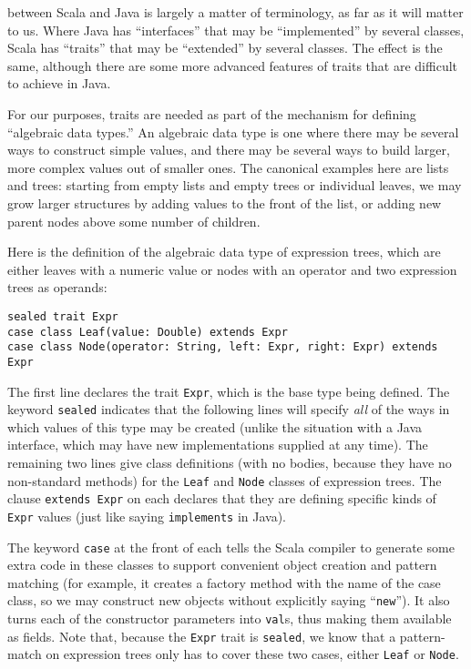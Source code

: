  between Scala and Java is largely a matter of terminology, as far as it will matter to us. Where Java has ``interfaces'' that may be ``implemented'' by several classes, Scala has ``traits'' that may be ``extended'' by several classes. The effect is the same, although there are some more advanced features of traits that are difficult to achieve in Java.

For our purposes, traits are needed as part of the mechanism for defining ``algebraic data types.'' An algebraic data type is one where there may be several ways to construct simple values, and there may be several ways to build larger, more complex values out of smaller ones. The canonical examples here are lists and trees: starting from empty lists and empty trees or individual leaves, we may grow larger structures by adding values to the front of the list, or adding new parent nodes above some number of children.

Here is the definition of the algebraic data type of expression trees, which are either leaves with a numeric value or nodes with an operator and two expression trees as operands:
\begin{verbatim}
sealed trait Expr
case class Leaf(value: Double) extends Expr
case class Node(operator: String, left: Expr, right: Expr) extends Expr
\end{verbatim}
The first line declares the trait \texttt{Expr}, which is the base type being defined. The keyword \texttt{sealed} indicates that the following lines will specify \emph{all} of the ways in which values of this type may be created (unlike the situation with a Java interface, which may have new implementations supplied at any time). The remaining two lines give class definitions (with no bodies, because they have no non-standard methods) for the \texttt{Leaf} and \texttt{Node} classes of expression trees. The clause \texttt{extends Expr} on each declares that they are defining specific kinds of \texttt{Expr} values (just like saying \texttt{implements} in Java).

The keyword \texttt{case} at the front of each tells the Scala compiler to generate some extra code in these classes to support convenient object creation and pattern matching (for example, it creates a factory method with the name of the case class, so we may construct new objects without explicitly saying ``\texttt{new}''). It also turns each of the constructor parameters into \texttt{val}s, thus making them available as fields. Note that, because the \texttt{Expr} trait is \texttt{sealed}, we know that a pattern-match on expression trees only has to cover these two cases, either \texttt{Leaf} or \texttt{Node}.

